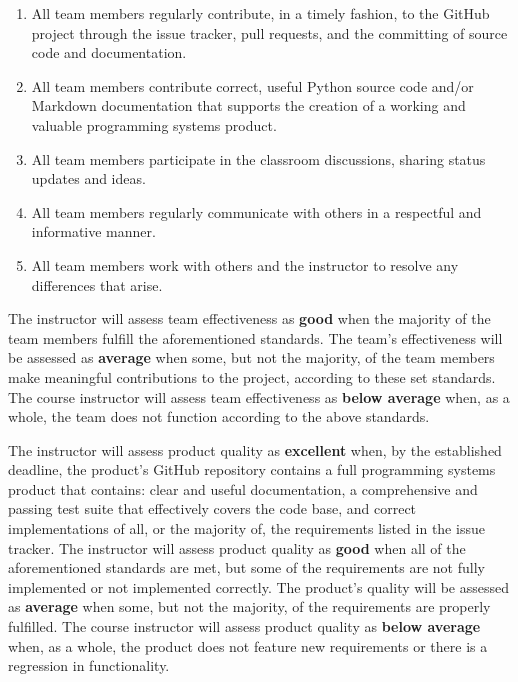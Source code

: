 \documentclass[11pt]{article}
\begin{document}
\begin{enumerate}
  \setlength{\itemsep}{0pt}

  \item All team members regularly contribute, in a timely fashion, to the GitHub project through the issue tracker,
    pull requests, and the committing of source code and documentation.

  \item All team members contribute correct, useful Python source code and/or Markdown documentation that supports the
    creation of a working and valuable programming systems product.

  \item All team members participate in the classroom discussions, sharing status updates and ideas.

  \item All team members regularly communicate with others in a respectful and informative manner.

  \item All team members work with others and the instructor to resolve any differences that arise.

\end{enumerate}

\vspace*{-.5em}

The instructor will assess team effectiveness as {\bf good} when the majority of the team members fulfill the
aforementioned standards. The team's effectiveness will be assessed as {\bf average} when some, but not the majority, of
the team members make meaningful contributions to the project, according to these set standards. The course instructor
will assess team effectiveness as {\bf below average} when, as a whole, the team does not function according to the
above standards.

The instructor will assess product quality as {\bf excellent} when, by the established deadline, the product's GitHub
repository contains a full programming systems product that contains: clear and useful documentation, a comprehensive
and passing test suite that effectively covers the code base, and correct implementations of all, or the majority of,
the requirements listed in the issue tracker. The instructor will assess product quality as {\bf good} when all of the
aforementioned standards are met, but some of the requirements are not fully implemented or not implemented correctly.
The product's quality will be assessed as {\bf average} when some, but not the majority, of the requirements are
properly fulfilled. The course instructor will assess product quality as {\bf below average} when, as a whole, the
product does not feature new requirements or there is a regression in functionality.
\end{document}
